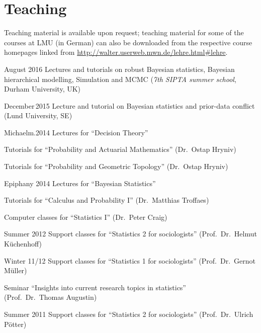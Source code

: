 \documentclass[a4paper]{simplecv}
\begin{document}
\section{Teaching}
\label{teaching}
Teaching material is available upon request;
teaching material for some of the courses at LMU (in German) can also be downloaded from the respective course homepages
linked from \url{http://walter.userweb.mwn.de/lehre.html#lehre}.
\begin{topic}
\item[August 2016] Lectures and tutorials on robust Bayesian statistics, Bayesian hierarchical modelling, Simulation and MCMC
(\emph{7th SIPTA summer school}, Durham University, UK)
\item[December\,2015] Lecture and tutorial on Bayesian statistics and prior-data conflict (Lund University, SE) 
\item[Michaelm.2014] Lectures for ``Decision Theory''

                    Tutorials for ``Probability and Actuarial Mathematics'' (Dr.\ Ostap Hryniv)

                    Tutorials for ``Probability and Geometric Topology'' (Dr.\ Ostap Hryniv)

\item[Epiphany 2014] Lectures for ``Bayesian Statistics''

                    Tutorials for ``Calculus and Probability I'' (Dr.\ Matthias Troffaes)

                    Computer classes for ``Statistics I'' (Dr.\ Peter Craig) 

\item[Summer 2012]  Support classes for ``Statistics 2 for sociologists'' (Prof.\ Dr.\ Helmut K\"{u}chenhoff)

\item[Winter 11/12] Support classes for ``Statistics 1 for sociologists'' (Prof.\ Dr.\ Gernot M\"{u}ller)

                    Seminar ``Insights into current research topics in statistics''\\ (Prof.\ Dr.\ Thomas Augustin)
                    
\item[Summer 2011]  Support classes for ``Statistics 2 for sociologists'' (Prof.\ Dr.\ Ulrich P\"{o}tter)


\end{topic}
\end{document}
